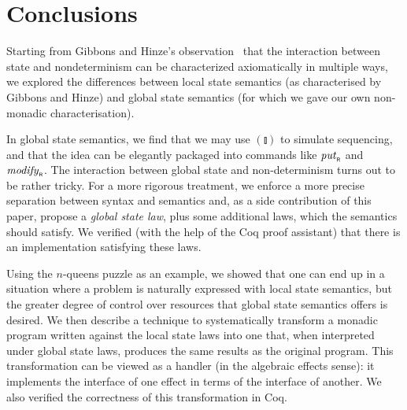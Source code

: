 \documentclass{jfp}
\newcommand{\Varid}[1]{\mathit{#1}}
\let\Varid\mathit
\begin{document}
\section{Conclusions}
\label{sec:conclusion}

Starting from Gibbons and Hinze's observation~\cite{GibbonsHinze:11:Just}
that the interaction between state and nondeterminism can be characterized
axiomatically in
multiple ways, we explored the differences between local state semantics (as
characterised by Gibbons and Hinze) and global state semantics (for which we
gave our own non-monadic characterisation).

In global state semantics, we find that we may use \ensuremath{(\talloblong)} to simulate sequencing, and that the idea can be elegantly packaged into commands like \ensuremath{\Varid{put}_{\scaleobj{0.7}{\sf R}}} and \ensuremath{\Varid{modify}_{\scaleobj{0.7}{\sf R}}}.
The interaction between global state and non-determinism turns out to be rather tricky.
For a more rigorous treatment, we enforce a more precise separation between
syntax and semantics and, as a side contribution of this paper, propose a
\emph{global state law}, plus some additional laws, which the semantics should satisfy.
We verified (with the help of the Coq proof assistant) that there is an implementation satisfying these laws.

Using the $n$-queens puzzle as an example, we showed that one can end up in a
situation where a problem is naturally expressed with local state semantics, but
the greater degree of control over resources that global state semantics offers
is desired. We then describe a technique to systematically transform a
monadic program written against the local state laws into one that,
when interpreted under global state laws, produces the same results as the
original program. This transformation can be viewed as a handler (in the
algebraic effects sense): it implements the interface of one effect in terms of
the interface of another.
We also verified the correctness of this transformation in Coq.
\end{document}

